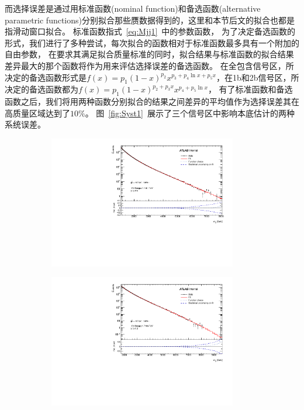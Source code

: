 而选择误差是通过用标准函数(nominal function)和备选函数(alternative parametric functions)分别拟合那些赝数据得到的，这里和本节后文的拟合也都是指滑动窗口拟合。
标准函数指式~\ref{eq:Mjj1}~中的参数函数，
为了决定备选函数的形式，我们进行了多种尝试，每次拟合的函数相对于标准函数最多具有一个附加的自由参数，
在要求其满足拟合质量标准的同时，拟合结果与标准函数的拟合结果差异最大的那个函数将作为用来评估选择误差的备选函数。
在全包含信号区，所决定的备选函数形式是$f(x)=p_1(1-x)^{p_2}x^{p_3+p_4\ln x+p_5x}$，在1b和2b信号区，所决定的备选函数都为$f(x)=p_1(1-x)^{p_2+p_3 x}x^{p_4 +p_5\ln x}$，
有了标准函数和备选函数之后，我们将用两种函数分别拟合的结果之间差异的平均值作为选择误差其在高质量区域达到了$10\%$。
图~\ref{fig:Syst1}~展示了三个信号区中影响本底估计的两种系统误差。


\begin{figure}[!thbp]
  \begin{subfigure}{.5\textwidth}
  \centering
  \includegraphics[width=0.9\textwidth]{figuresDijet/07-SystematicUncertainties/uncertQ1.pdf}
  \caption{}
  \end{subfigure}
  \begin{subfigure}{.5\textwidth}
  \centering
  \includegraphics[width=0.9\textwidth]{figuresDijet/07-SystematicUncertainties/uncertWstar.pdf}

\end{subfigure}
\end{figure}
